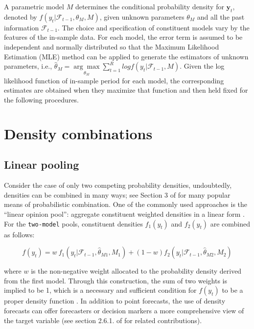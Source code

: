 \documentclass{monashthesis}
\begin{document}
A parametric model \(M\) determines the conditional probability density for \(\textbf{y}_t\), denoted by \(f(y_t|\mathcal{F}_{t-1}, \theta_M, M)\), given unknown parameters \(\theta_M\) and all the past information \(\mathcal{F}_{t-1}\). The choice and specification of constituent models vary by the features of the in-sample data. For each model, the error term is assumed to be independent and normally distributed so that the Maximum Likelihood Estimation (MLE) method can be applied to generate the estimators of unknown parameters, i.e., \(\hat\theta_M = \underset{\theta_M}{\arg\max} \sum^R_{t=1} log f(y_t|\mathcal{F}_{t-1}, M)\). Given the log likelihood function of in-sample period for each model, the corresponding estimates are obtained when they maximize that function and then held fixed for the following procedures.

\hypertarget{density-combinations}{%
\section{Density combinations}\label{density-combinations}}

\hypertarget{linear-pooling}{%
\subsection{Linear pooling}\label{linear-pooling}}

Consider the case of only two competing probability densities, undoubtedly, densities can be combined in many ways; see Section 3 of \textcite{WHLK22} for many popular means of probabilistic combination. One of the commonly used approaches is the ``linear opinion pool'': aggregate constituent weighted densities in a linear form \autocites[e.g.,][]{BG69,HM07,GA11}. For the \texttt{two-model} pools, constituent densities \(f_1(y_t)\) and \(f_2(y_t)\) are combined as follows:

\begin{equation}
\label{eqn:LC1}
f(y_t) = w \ f_1(y_t | \mathcal{F}_{t-1}, \hat\theta_{M1}, M_1) + (1-w) f_2(y_t | \mathcal{F}_{t-1}, \hat\theta_{M2}, M_2)
\end{equation}

where \(w\) is the non-negative weight allocated to the probability density derived from the first model. Through this construction, the sum of two weights is implied to be 1, which is a necessary and sufficient condition for \(f(y_t)\) to be a proper density function \autocite{GA11}. In addition to point forecasts, the use of density forecasts can offer forecasters or decision markers a more comprehensive view of the target variable (see section 2.6.1. of \textcite{FTP22} for related contributions).
\end{document}
